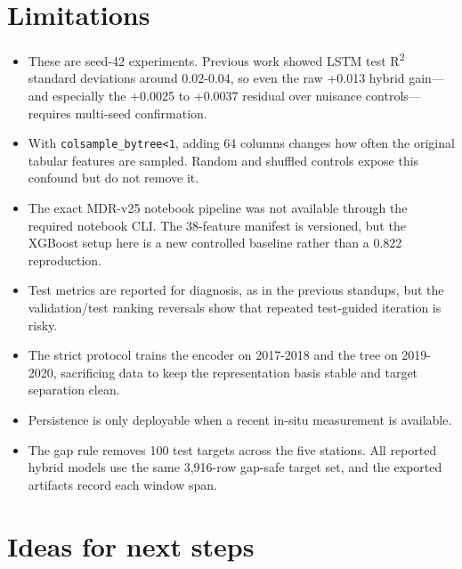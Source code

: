 \documentclass[11pt]{article}
\newcommand{\code}[1]{\begingroup\footnotesize\nolinkurl{#1}\endgroup}
\begin{document}
\section{Limitations}

\begin{itemize}
\item These are seed-42 experiments. Previous work showed LSTM test R\textsuperscript{2} standard deviations around 0.02-0.04, so even the raw +0.013 hybrid gain—and especially the +0.0025 to +0.0037 residual over nuisance controls—requires multi-seed confirmation.
\item With \code{colsample_bytree<1}, adding 64 columns changes how often the original tabular features are sampled. Random and shuffled controls expose this confound but do not remove it.
\item The exact MDR-v25 notebook pipeline was not available through the required notebook CLI. The 38-feature manifest is versioned, but the XGBoost setup here is a new controlled baseline rather than a 0.822 reproduction.
\item Test metrics are reported for diagnosis, as in the previous standups, but the validation/test ranking reversals show that repeated test-guided iteration is risky.
\item The strict protocol trains the encoder on 2017-2018 and the tree on 2019-2020, sacrificing data to keep the representation basis stable and target separation clean.
\item Persistence is only deployable when a recent in-situ measurement is available.
\item The gap rule removes 100 test targets across the five stations. All reported hybrid models use the same 3,916-row gap-safe target set, and the exported artifacts record each window span.
\end{itemize}

\section{Ideas for next steps}
\end{document}
